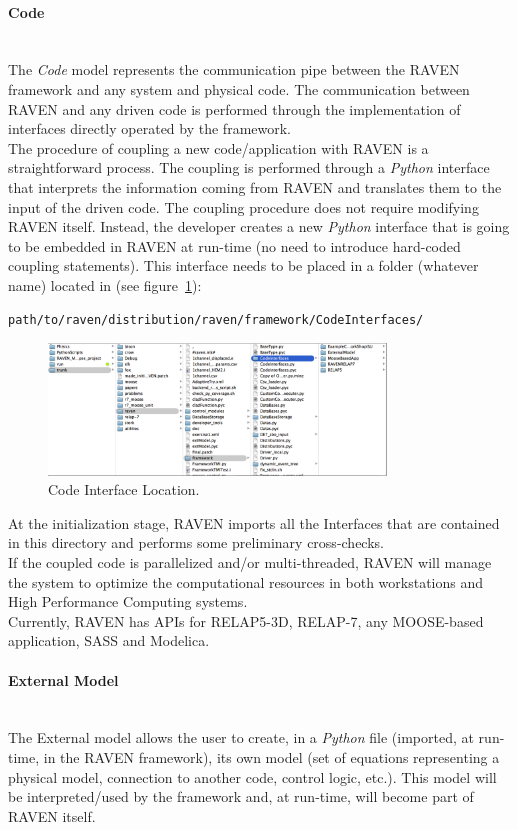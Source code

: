 \paragraph{Code} ~\\ 
The \textit{Code} model represents the communication pipe between the RAVEN framework and any system and physical code. The communication between RAVEN and any driven code is performed through the implementation of interfaces directly operated by the framework. 
\\The procedure of coupling a new code/application with RAVEN is a straightforward process. The coupling is performed through a \textit{Python}  interface that interprets the information coming from RAVEN and translates them to the input of the driven code. The coupling procedure does not require modifying RAVEN itself. Instead, the developer creates a new \textit{Python} interface that is going to be embedded in RAVEN at run-time (no need to introduce hard-coded coupling statements).  This interface needs to be placed in a folder (whatever name) located in (see figure~\ref{fig:CodeInterfaceLocation}):
\begin{lstlisting}[language=bash]
 path/to/raven/distribution/raven/framework/CodeInterfaces/
\end{lstlisting}

\begin{figure}
  \centering
  \includegraphics[width=0.8\textwidth]  {pics/CodeInterfaceLocation.png}
  \caption{Code Interface Location.}
  \label{fig:CodeInterfaceLocation}
\end{figure}
At the initialization stage, RAVEN imports all the Interfaces that are contained in this directory and performs some preliminary cross-checks. 
\\ If the coupled code is parallelized and/or multi-threaded, RAVEN will manage the system to optimize the computational resources in both workstations and High Performance Computing systems.
\\Currently, RAVEN has APIs for RELAP5-3D, RELAP-7, any MOOSE-based application, SASS and Modelica.
\paragraph{External Model} ~\\
The External model allows the user to create, in a \textit{Python} file (imported, at run-time, in the RAVEN framework), its own model (set of equations representing a physical model, connection to another code, control logic, etc.). This model will be interpreted/used by the framework and, at run-time, will become part of RAVEN itself.

